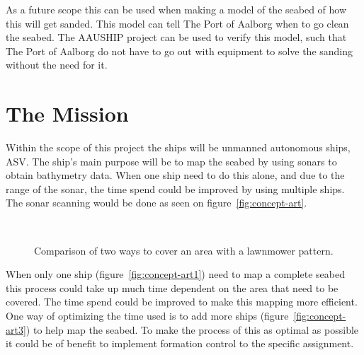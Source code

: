 As a future scope this can be used when making a model of the seabed of how this will get sanded. This model can tell The Port of Aalborg when to go clean the seabed. The AAUSHIP project can be used to verify this model, such that The Port of Aalborg do not have to go out with equipment to solve the sanding without the need for it.

\section{The Mission}
\label{sc:mission}
Within the scope of this project the ships will be unmanned autonomous ships,
\ac{ASV}. The ship's main purpose will be to map the seabed by using
sonars to obtain bathymetry data. When one ship need to do this alone, and due to the range of
the sonar, the time spend could be improved by using multiple ships. The sonar scanning would
be done as seen on figure~\vref{fig:concept-art}.

\begin{figure}[htbp]
	\centering
	\ %
	\caption{Comparison of two ways to cover an area with a lawnmower
	pattern.}
	\label{fig:concept-art}
\end{figure}


When only one ship (figure~\vref{fig:concept-art1}) need to map a complete seabed this process could
take up much time dependent on the area that need to be covered. The
time spend could be improved to make this mapping more efficient. One
way of optimizing the time used is to add more ships (figure~\vref{fig:concept-art3}) to help map the
seabed. To make the process of this as optimal as possible it could be
of benefit to implement formation control to the specific assignment.

